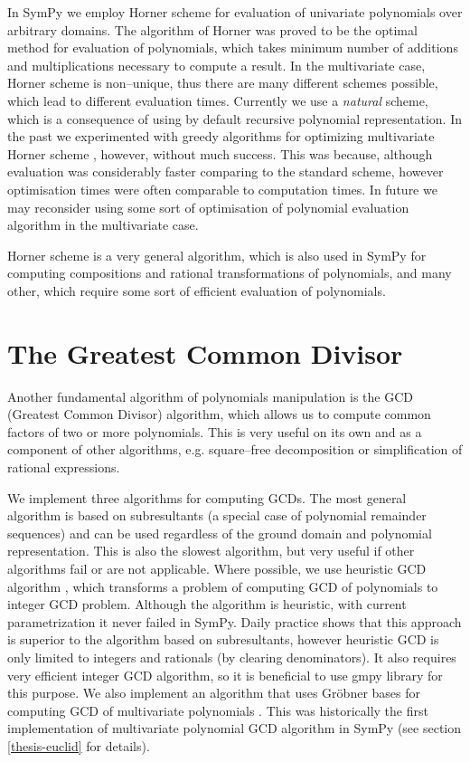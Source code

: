 In SymPy we employ Horner scheme \cite{Geddes1992algorithms} for evaluation of univariate polynomials
over arbitrary domains. The algorithm of Horner was proved to be the optimal method for evaluation
of polynomials, which takes minimum number of additions and multiplications necessary to compute
a result. In the multivariate case, Horner scheme is non--unique, thus there are many different
schemes possible, which lead to different evaluation times. Currently we use a \emph{natural} scheme,
which is a consequence of using by default recursive polynomial representation. In the past we
experimented with greedy algorithms for optimizing multivariate Horner scheme \cite{Ceberio2004greedy},
however, without much success. This was because, although evaluation was considerably faster comparing
to the standard scheme, however optimisation times were often comparable to computation times. In future
we may reconsider using some sort of optimisation of polynomial evaluation algorithm in the multivariate
case.

Horner scheme is a very general algorithm, which is also used in SymPy for computing compositions
and rational transformations of polynomials, and many other, which require some sort of efficient
evaluation of polynomials.


\section{The Greatest Common Divisor}

Another fundamental algorithm of polynomials manipulation is the GCD (Greatest Common Divisor)
algorithm, which allows us to compute common factors of two or more polynomials. This is very
useful on its own and as a component of other algorithms, e.g. square--free decomposition or
simplification of rational expressions.

We implement three algorithms for computing GCDs. The most general algorithm is based on
subresultants (a special case of polynomial remainder sequences) and can be used regardless
of the ground domain and polynomial representation. This is also the slowest algorithm, but
very useful if other algorithms fail or are not applicable. Where possible, we use heuristic
GCD algorithm \cite{Liao1995heuristic}, which transforms a problem of computing GCD of polynomials
to integer GCD problem. Although the algorithm is heuristic, with current parametrization it
never failed in SymPy. Daily practice shows that this approach is superior to the algorithm
based on subresultants, however heuristic GCD is only limited to integers and rationals (by
clearing denominators). It also requires very efficient integer GCD algorithm, so it is
beneficial to use gmpy library for this purpose. We also implement an algorithm that uses
Gröbner bases for computing GCD of multivariate polynomials \cite{Cox1997ideals}. This was
historically the first implementation of multivariate polynomial GCD algorithm in SymPy
(see section \ref{thesis-euclid} for details).

